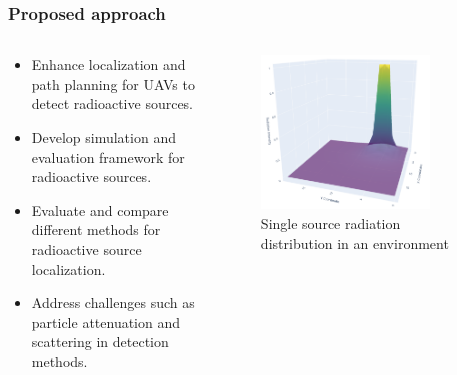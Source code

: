 \documentclass[aspectratio=169]{beamer}
\begin{document}
\begin{frame}
  \frametitle{Proposed approach}
  
  \begin{columns}
    \begin{column}{0.5\textwidth}
      \begin{itemize}
        \item Enhance localization and path planning for UAVs to detect radioactive sources.
        \item Develop simulation and evaluation framework for radioactive sources.
        \item Evaluate and compare different methods for radioactive source localization.
        \item Address challenges such as particle attenuation and scattering in detection methods.
      \end{itemize}
  
    \end{column}
    \begin{column}{0.5\textwidth}

      \begin{figure}
        \centering
        \includegraphics[width=0.8\textwidth]{images/radiation_distribution.png}
        \caption{Single source radiation distribution in an environment}
        \label{fig:approach}
      \end{figure}
  
    \end{column}
  \end{columns}
    
  \end{frame}



\end{document}
